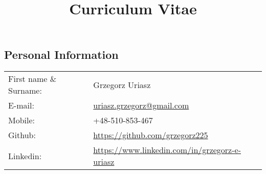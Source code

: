 \documentclass[margin,line,pifont,palatino,courier]{res}
\begin{document}
\title{Curriculum Vitae}
\begin{resume}

\section{\sc Personal Information}

\vspace{.05in}
\begin{tabular}{@{}p{1.8in}p{3in}}
First name \& Surname: & Grzegorz Uriasz \\
E-mail: & \href{mailto:uriasz.grzegorz@gmail.com}{uriasz.grzegorz@gmail.com} \\
Mobile: & +48-510-853-467 \\
Github: & \href{https://github.com/grzegorz225}{https://github.com/grzegorz225} \\
Linkedin: & \href{https://www.linkedin.com/in/grzegorz-e-uriasz}{https://www.linkedin.com/in/grzegorz-e-uriasz} \\
\end{tabular}







\end{resume}
\end{document}
